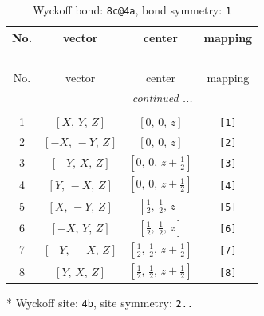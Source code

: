\documentclass[fleqn,8pt]{jsarticle}
\begin{document}
\begin{longtable}{cccc}
\caption{Wyckoff bond: {\tt 8c@4a}, bond symmetry: {\tt 1}}
 \\
 \hline \hline
No. & vector & center & mapping \\ \hline \endfirsthead

\multicolumn{3}{l}{\tablename\ \thetable{}} \\
 \hline \hline
No. & vector & center & mapping \\ \hline \endhead

 \hline \hline
\multicolumn{3}{r}{\footnotesize\it continued ...} \\ \endfoot

 \hline \hline
\multicolumn{3}{r}{} \\ \endlastfoot

1 & $\left[ X,\, Y,\, Z \right]$ & $\left[ 0,\, 0,\, z \right]$ & {\tt [1]} \\ \hline
2 & $\left[ - X,\, - Y,\, Z \right]$ & $\left[ 0,\, 0,\, z \right]$ & {\tt [2]} \\ \hline
3 & $\left[ - Y,\, X,\, Z \right]$ & $\left[ 0,\, 0,\, z + \frac{1}{2} \right]$ & {\tt [3]} \\ \hline
4 & $\left[ Y,\, - X,\, Z \right]$ & $\left[ 0,\, 0,\, z + \frac{1}{2} \right]$ & {\tt [4]} \\ \hline
5 & $\left[ X,\, - Y,\, Z \right]$ & $\left[ \frac{1}{2},\, \frac{1}{2},\, z \right]$ & {\tt [5]} \\ \hline
6 & $\left[ - X,\, Y,\, Z \right]$ & $\left[ \frac{1}{2},\, \frac{1}{2},\, z \right]$ & {\tt [6]} \\ \hline
7 & $\left[ - Y,\, - X,\, Z \right]$ & $\left[ \frac{1}{2},\, \frac{1}{2},\, z + \frac{1}{2} \right]$ & {\tt [7]} \\ \hline
8 & $\left[ Y,\, X,\, Z \right]$ & $\left[ \frac{1}{2},\, \frac{1}{2},\, z + \frac{1}{2} \right]$ & {\tt [8]} \\
\end{longtable}
* Wyckoff site: {\tt 4b}, site symmetry: {\tt 2..}
\renewcommand{\arraystretch}{1.2}
\end{document}
